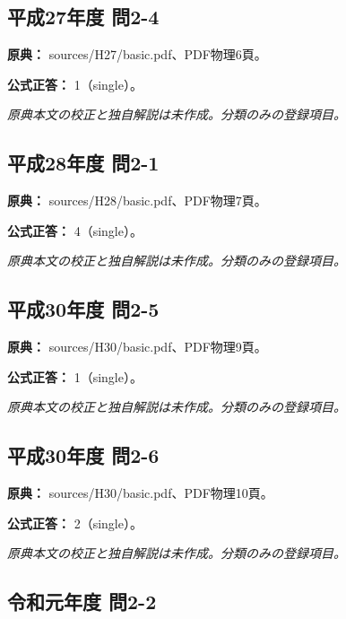 \subsection{平成27年度 問2-4}
\label{q:h27-reg-basic-2-4}

\noindent\textbf{原典：} sources/H27/basic.pdf、PDF物理6頁。

\textbf{公式正答：} 1（single）。

\par\textit{原典本文の校正と独自解説は未作成。分類のみの登録項目。}

\subsection{平成28年度 問2-1}
\label{q:h28-reg-basic-2-1}

\noindent\textbf{原典：} sources/H28/basic.pdf、PDF物理7頁。

\textbf{公式正答：} 4（single）。

\par\textit{原典本文の校正と独自解説は未作成。分類のみの登録項目。}

\subsection{平成30年度 問2-5}
\label{q:h30-reg-basic-2-5}

\noindent\textbf{原典：} sources/H30/basic.pdf、PDF物理9頁。

\textbf{公式正答：} 1（single）。

\par\textit{原典本文の校正と独自解説は未作成。分類のみの登録項目。}

\subsection{平成30年度 問2-6}
\label{q:h30-reg-basic-2-6}

\noindent\textbf{原典：} sources/H30/basic.pdf、PDF物理10頁。

\textbf{公式正答：} 2（single）。

\par\textit{原典本文の校正と独自解説は未作成。分類のみの登録項目。}

\subsection{令和元年度 問2-2}
\label{q:r01-reg-basic-2-2}

